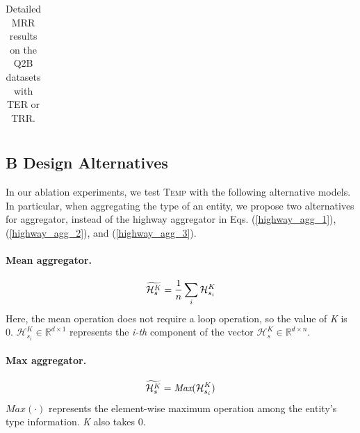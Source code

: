 \begin{table}[htp]
\begin{tabular*}{\linewidth}{@{}cccccccccccccc@{}}
\bottomrule
\end{tabular*}
\caption{Detailed MRR results on the Q2B datasets with TER or TRR.}
\label{table_8}
\end{table}


\subsection*{B  Design Alternatives}
\label{section_design_alternatives}
In our ablation experiments, we test \textsc{Temp} with the following alternative models. In particular, when aggregating the type of an entity, we propose two alternatives for aggregator, instead of the highway aggregator in Eqs. (\ref{highway_agg_1}), (\ref{highway_agg_2}), and (\ref{highway_agg_3}). \\
\vspace{-0.4cm}
\paragraph{Mean aggregator.}
\begin{equation}
\setlength{\abovedisplayskip}{-3pt}
\setlength{\belowdisplayskip}{-3pt}
\widetilde{\mathcal{H}_{s}^{K}} = \frac{1}{n}\sum_{i} \mathcal{H}_{s_{i}}^{K}
\end{equation}
Here, the mean operation does not require a loop operation, so the value of \emph{K} is 0. $\mathcal{H}_{s_{i}}^{K}\in\mathbb{R}^{d\times 1}$ represents the \emph{i-th} component of the vector $\mathcal{H}_{s}^{K}\in\mathbb{R}^{d\times n}$. \\
\vspace{-0.4cm}
\paragraph{Max  aggregator.}
\begin{equation}
\setlength{\abovedisplayskip}{-3pt}
\setlength{\belowdisplayskip}{-1pt}
\widetilde{\mathcal{H}_{s}^{K}} = \textit{Max}(\mathcal{H}_{s_{i}}^{K})
\end{equation}
$\textit{Max}(\cdot)$ represents the element-wise maximum operation among the entity's type information. \emph{K} also takes 0.\\
\vspace{-0.4cm}
